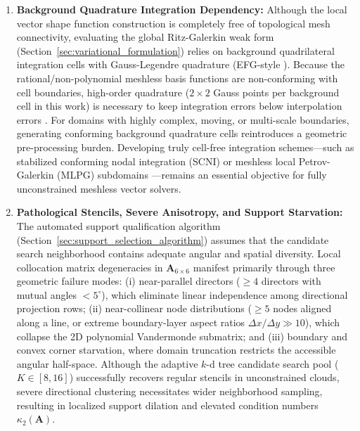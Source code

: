 \documentclass[preprint,12pt]{elsarticle}
\begin{document}
\begin{enumerate}
    \item \textbf{Background Quadrature Integration Dependency:} 
    Although the local vector shape function construction is completely free of topological mesh connectivity, evaluating the global Ritz-Galerkin weak form (Section~\ref{sec:variational_formulation}) relies on background quadrilateral integration cells with Gauss-Legendre quadrature (EFG-style \cite{belytschko1994element, dolbow1999numerical}). Because the rational/non-polynomial meshless basis functions are non-conforming with cell boundaries, high-order quadrature ($2 \times 2$ Gauss points per background cell in this work) is necessary to keep integration errors below interpolation errors \cite{dolbow1999numerical}. For domains with highly complex, moving, or multi-scale boundaries, generating conforming background quadrature cells reintroduces a geometric pre-processing burden. Developing truly cell-free integration schemes---such as stabilized conforming nodal integration (SCNI) or meshless local Petrov-Galerkin (MLPG) subdomains \cite{atluri2002meshless}---remains an essential objective for fully unconstrained meshless vector solvers.

    \item \textbf{Pathological Stencils, Severe Anisotropy, and Support Starvation:} 
    The automated support qualification algorithm (Section~\ref{sec:support_selection_algorithm}) assumes that the candidate search neighborhood contains adequate angular and spatial diversity. Local collocation matrix degeneracies in $\mathbf{A}_{6 \times 6}$ manifest primarily through three geometric failure modes: (i) near-parallel directors ($\ge 4$ directors with mutual angles $< 5^\circ$), which eliminate linear independence among directional projection rows; (ii) near-collinear node distributions ($\ge 5$ nodes aligned along a line, or extreme boundary-layer aspect ratios $\Delta x / \Delta y \gg 10$), which collapse the 2D polynomial Vandermonde submatrix; and (iii) boundary and convex corner starvation, where domain truncation restricts the accessible angular half-space. Although the adaptive $k$-d tree candidate search pool ($K \in [8, 16]$) successfully recovers regular stencils in unconstrained clouds, severe directional clustering necessitates wider neighborhood sampling, resulting in localized support dilation and elevated condition numbers $\kappa_2(\mathbf{A})$.


\end{enumerate}
\end{document}
